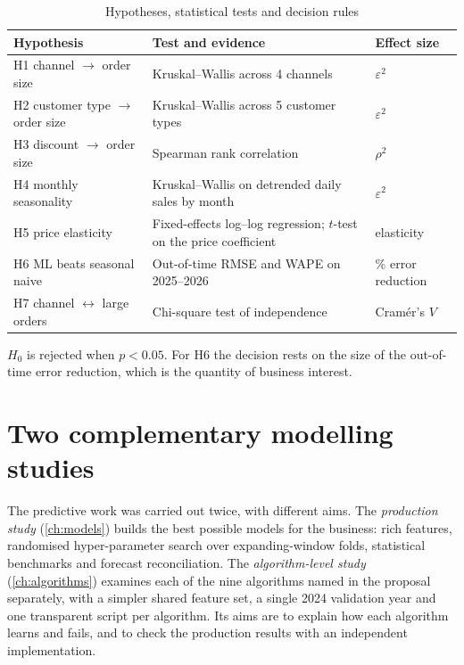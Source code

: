 \begin{table}[htbp]\centering\small
\caption{Hypotheses, statistical tests and decision rules}\label{tab:hypmap}
\begin{tabularx}{\linewidth}{@{}lXl@{}}
\toprule
\textbf{Hypothesis} & \textbf{Test and evidence} & \textbf{Effect size} \\ \midrule
H1 channel $\rightarrow$ order size & Kruskal--Wallis across 4 channels & $\varepsilon^2$ \\
H2 customer type $\rightarrow$ order size & Kruskal--Wallis across 5 customer types & $\varepsilon^2$ \\
H3 discount $\rightarrow$ order size & Spearman rank correlation & $\rho^2$ \\
H4 monthly seasonality & Kruskal--Wallis on detrended daily sales by month & $\varepsilon^2$ \\
H5 price elasticity & Fixed-effects log--log regression; $t$-test on the price coefficient & elasticity \\
H6 ML beats seasonal naive & Out-of-time RMSE and WAPE on 2025--2026 & \% error reduction \\
H7 channel $\leftrightarrow$ large orders & Chi-square test of independence & Cram\'er's $V$ \\ \bottomrule
\end{tabularx}
\par\smallskip\footnotesize $H_0$ is rejected when $p<0.05$. For H6 the decision rests on the size of the
out-of-time error reduction, which is the quantity of business interest.
\end{table}

\section{Two complementary modelling studies}
The predictive work was carried out twice, with different aims. The \emph{production study}
(\cref{ch:models}) builds the best possible models for the business: rich features, randomised hyper-parameter
search over expanding-window folds, statistical benchmarks and forecast reconciliation. The
\emph{algorithm-level study} (\cref{ch:algorithms}) examines each of the nine algorithms named in the proposal
separately, with a simpler shared feature set, a single 2024 validation year and one transparent script per
algorithm. Its aims are to explain how each algorithm learns and fails, and to check the production results
with an independent implementation.

